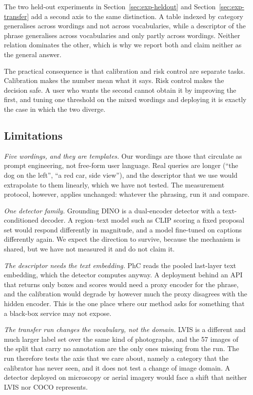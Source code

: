 The two held-out experiments in Section~\ref{sec:exp-heldout} and Section~\ref{sec:exp-transfer}
add a second axis to the same distinction. A table indexed by category generalises across wordings
and not across vocabularies, while a descriptor of the phrase generalises across vocabularies and
only partly across wordings. Neither relation dominates the other, which is why we report both and
claim neither as the general answer.

The practical consequence is that calibration and risk control are separate tasks. Calibration
makes the number mean what it says. Risk control makes the decision safe. A user who wants the
second cannot obtain it by improving the first, and tuning one threshold on the mixed wordings and
deploying it is exactly the case in which the two diverge.

\subsection{Limitations}

\emph{Five wordings, and they are templates.} Our wordings are those that circulate as prompt
engineering, not free-form user language. Real queries are longer (``the dog on the left'', ``a red
car, side view''), and the descriptor that we use would extrapolate to them linearly, which we have
not tested. The measurement protocol, however, applies unchanged: whatever the phrasing, run it
and compare.

\emph{One detector family.} Grounding DINO is a dual-encoder detector with a text-conditioned
decoder. A region--text model such as CLIP scoring a fixed proposal set would respond differently
in magnitude, and a model fine-tuned on captions differently again. We expect the direction to
survive, because the mechanism is shared, but we have not measured it and do not claim it.

\emph{The descriptor needs the text embedding.} PhC reads the pooled last-layer text embedding,
which the detector computes anyway. A deployment behind an API that returns only boxes and scores
would need a proxy encoder for the phrase, and the calibration would degrade by however much the
proxy disagrees with the hidden encoder. This is the one place where our method asks for something
that a black-box service may not expose.

\emph{The transfer run changes the vocabulary, not the domain.} LVIS is a different and much larger
label set over the same kind of photographs, and the 57 images of the split that carry no
annotation are the only ones missing from the run. The run therefore tests the axis that we care
about, namely a category that the calibrator has never seen, and it does not test a change of image
domain. A detector deployed on microscopy or aerial imagery would face a shift that neither LVIS
nor COCO represents.

